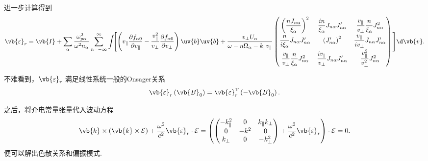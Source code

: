 进一步计算得到
\begin{equation*}
	\vb{\varepsilon}_r = \vb{I} + \sum_\alpha \frac{\omega_{p\alpha}^2}{\omega^2 n_\alpha}\sum_{n=-\infty}^{\infty}\int\!\!\Bigg[ \!\left(v_\parallel\frac{\partial f_{\alpha0}}{\partial v_\parallel}-\frac{v_\parallel^2}{v_\perp}\frac{\partial f_{\alpha0}}{\partial v_\perp} \right)\uv{b}\uv{b} + \frac{v_\perp U_\alpha}{\omega-n\Omega_\alpha-k_\parallel v_\parallel}
		\begin{pmatrix}
			\left( \dfrac{nJ_{n\alpha}}{\xi_\alpha} \right)^2              & \dfrac{in}{\xi_\alpha}J_{n\alpha}J_{n\alpha}'        & \dfrac{v_\parallel}{v_\perp}\dfrac{n}{\xi_\alpha}J_{n\alpha}^2 \\[8pt]
			\dfrac{n}{i\xi_\alpha}J_{n\alpha}J_{n\alpha}'                  & \left( J_{n\alpha}' \right)^2                        & \dfrac{v_\parallel}{iv_\perp}J_{n\alpha}J_{n\alpha}'           \\[8pt]
			\dfrac{v_\parallel}{v_\perp}\dfrac{n}{\xi_\alpha}J_{n\alpha}^2 & \dfrac{iv_\parallel}{v_\perp}J_{n\alpha}J_{n\alpha}' & \dfrac{v_\parallel^2}{v_\perp^2}J_{n\alpha}^2
		\end{pmatrix}\Bigg]\d \vb{v}.
\end{equation*}

不难看到，\(\vb{\varepsilon}_r\) 满足线性系统一般的Onsager关系
\begin{equation*}
	\vb{\varepsilon}_r\left( \vb{B}_0 \right) = \vb{\varepsilon}_r^\mathrm{T}\left( -\vb{B}_0 \right).
\end{equation*}

之后，将介电常量张量代入波动方程
\begin{equation*}
	\vb{k}\times\left( \vb{k}\times\mathcal{E} \right) + \frac{\omega^2}{c^2}\vb{\varepsilon}_r\cdot\mathcal{E} = \left( \begin{pmatrix} -k_\parallel^2 & 0 & k_\parallel k_\perp \\ 0 & -k^2 & 0 \\ k_\perp & 0 & -k_\perp^2 \end{pmatrix} + \frac{\omega^2}{c^2}\vb{\varepsilon}_r \right)\cdot\mathcal{E} = 0.
\end{equation*}
便可以解出色散关系和偏振模式.

